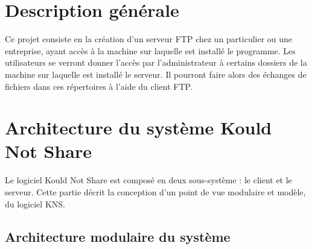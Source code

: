 \documentclass[10pt,a4paper]{report}
\begin{document}
\section{Description générale}

Ce projet consiste en la création d'un serveur FTP chez un particulier ou une entreprise, ayant accès à la machine sur laquelle est installé le programme. Les utilisateurs se verront donner l'accès par l'administrateur à certains dossiers de la machine sur laquelle est installé le serveur. Il pourront faire alors des échanges de fichiers dans ces répertoires à l'aide du client FTP.\\

\section{Architecture du système Kould Not Share}

		Le logiciel Kould Not Share est composé en deux sous-système : le client et le serveur. Cette partie décrit la conception d'un point de vue modulaire et modèle, du logiciel KNS.
		
					
    

	\subsection{Architecture modulaire du système}
\end{document}
